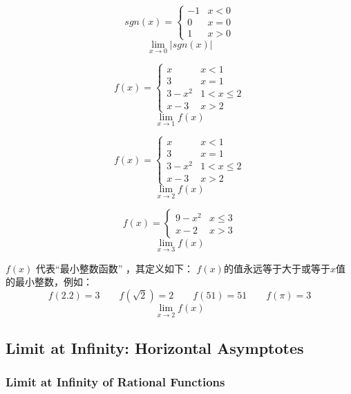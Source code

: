 \documentclass[UTF8]{ctexart}
\begin{document}
\[ sgn(x) = 
\begin{cases}
-1 & x < 0\\
0 & x=0 \\
1 & x > 0
\end{cases}
\]
\[{\lim_{x \to 0} |sgn(x)|}\]

\[ f(x) = 
\begin{cases}
x & x < 1\\
3 & x=1 \\
3-x^2 & 1<x \leq 2\\
x-3 & x>2
\end{cases}
\]
\[{\lim_{x \to 1} f(x)}\]

\[ f(x) = 
\begin{cases}
x & x < 1\\
3 & x=1 \\
3-x^2 & 1<x \leq 2\\
x-3 & x>2
\end{cases}
\]
\[{\lim_{x \to 2} f(x)}\]

\[f(x) = 
\begin{cases}
9-x^2 & x \leq 3\\
x-2 & x>3
\end{cases}
\]
\[{\lim_{x \to 3} f(x)}\]

$f(x)$ 代表“最小整数函数” ，其定义如下： $f(x)$的值永远等于大于或等于$x$值的最小整数，例如：
\[f(2.2) = 3 \qquad  f(\sqrt{2}) = 2 \qquad f(51) = 51 \qquad f(\pi) = 3\]
\[{\lim_{x \to 2} f(x)}\]


































\subsection{Limit at Infinity: Horizontal Asymptotes}
\subsubsection{Limit at Infinity of Rational Functions}
\end{document}
